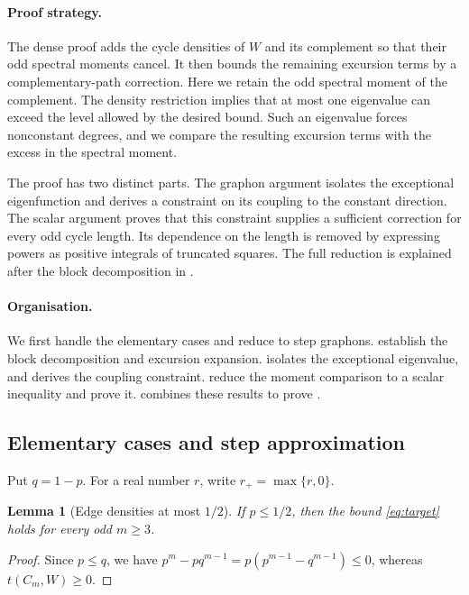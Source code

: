 \documentclass[11pt]{article}
\numberwithin{equation}{section}
\newtheorem{lemma}[theorem]{Lemma}
\begin{document}
\paragraph{Proof strategy.}
The dense proof adds the cycle densities of $W$ and its complement
so that their odd spectral moments cancel. It then bounds the
remaining excursion terms by a complementary-path correction.
Here we retain the odd spectral moment of the complement. The
density restriction implies that at most one eigenvalue can exceed
the level allowed by the desired bound. Such an eigenvalue forces
nonconstant degrees, and we compare the resulting excursion terms
with the excess in the spectral moment.

The proof has two distinct parts. The graphon argument isolates the
exceptional eigenfunction and derives a constraint on its coupling
to the constant direction. The scalar argument proves that this
constraint supplies a sufficient correction for every odd cycle
length. Its dependence on the length is removed by expressing powers
as positive integrals of truncated squares. The full reduction is
explained after the block decomposition in .

\paragraph{Organisation.}
We first handle the elementary cases and reduce to step graphons.
 establish the block decomposition
and excursion expansion.  isolates the exceptional
eigenvalue, and  derives the coupling constraint.
 reduce the moment comparison to a
scalar inequality and prove it.  combines these
results to prove .

\subsection{Elementary cases and step approximation}

Put $q=1-p$. For a real number $r$, write $r_+=\max\{r,0\}$.
\begin{lemma}[Edge densities at most $1/2$]\label{lem:low-density}
If $p\le1/2$, then the bound \eqref{eq:target} holds for every odd $m\ge3$.
\end{lemma}
\begin{proof}
Since $p\le q$, we have
$p^{m}-pq^{m-1}=p(p^{m-1}-q^{m-1})\le0$, whereas $t(C_m,W)\ge0$.
\end{proof}
\end{document}
